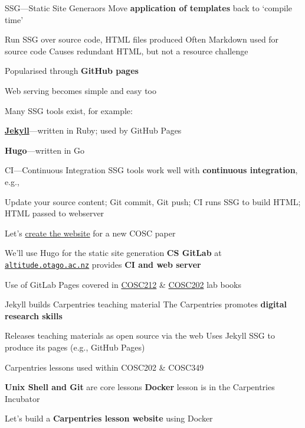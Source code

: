 \documentclass[aspectratio=169,t]{beamer}
\begin{document}
\begin{dframe}{SSG---Static Site Generaors}
  \1 Move \textbf{application of templates} back to `compile time'

  \2 Run SSG over source code, HTML files produced
  \2 Often Markdown used for source code
  \2 Causes redundant HTML, but not a resource challenge

  \1 Popularised through \textbf{GitHub pages}

  \2 Web serving becomes simple and easy too


  \1 Many SSG tools exist, for example:

  \2 \textbf{\href{http://jekyllrb.com}{Jekyll}}---written in Ruby; used by GitHub Pages

  \2 \textbf{Hugo}---written in Go
\end{dframe}

\begin{dframe}{CI---Continuous Integration}
  \1 SSG tools work well with \textbf{continuous integration}, e.g., 

  \2 Update your source content;
  \2 Git commit, Git push;
  \2 CI runs SSG to build HTML;
  \2 HTML passed to webserver
   
  \bigskip
  
  \1 Let's \href{https://altitude.otago.ac.nz/cosc312}{create the website} for a new COSC paper
  
  \2 We'll use Hugo for the static site generation
  \2 \textbf{CS GitLab} at \href{https://altitude.otago.ac.nz/}{\texttt{altitude.otago.ac.nz}} provides \textbf{CI and web server}
 
  \3 Use of GitLab Pages covered in \href{http://cosc212.cspages.otago.ac.nz/LabBook/LabBook.pdf}{COSC212} \& \href{http://cosc202.cspages.otago.ac.nz/lab-book/COSC202LabBook.pdf}{COSC202} lab books
\end{dframe}

\begin{dframe}{Jekyll builds Carpentries teaching material}
  \1 The Carpentries promotes \textbf{digital research skills}

  \2 Releases teaching materials as open source via the web
  \2 Uses Jekyll SSG to produce its pages (e.g., GitHub Pages)

  \bigskip

  \1 Carpentries lessons used within COSC202 \& COSC349
  
  \2 \textbf{Unix Shell and Git} are core lessons
  \2 \textbf{Docker} lesson is in the Carpentries Incubator
  
  \bigskip

  \1 Let's build a \textbf{Carpentries lesson website} using Docker
\end{dframe}
\end{document}
